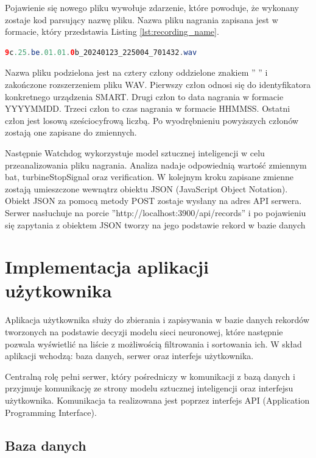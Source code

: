 \documentclass{sprz}
\begin{document}
Pojawienie się nowego pliku wywołuje zdarzenie, które powoduje, że wykonany zostaje kod parsujący nazwę pliku. Nazwa pliku nagrania zapisana jest w formacie, który przedstawia Listing \ref{lst:recording_name}.

\begin{lstlisting}[language=Java,caption={Przykładowa nazwa pliku nagrania}, label={lst:recording_name}]
  9c.25.be.01.01.0b_20240123_225004_701432.wav
\end{lstlisting}

Nazwa pliku podzielona jest na cztery człony oddzielone znakiem ” ” i zakończone rozszerzeniem pliku WAV. Pierwszy człon odnosi się do identyfikatora konkretnego urządzenia SMART. Drugi człon to data nagrania w formacie YYYYMMDD. Trzeci człon to czas nagrania w formacie HHMMSS. Ostatni człon jest losową sześciocyfrową liczbą. Po wyodrębnieniu powyższych członów zostają one zapisane do zmiennych.


Następnie Watchdog wykorzystuje model sztucznej inteligencji w celu przeanalizowania pliku nagrania. Analiza nadaje odpowiednią wartość zmiennym bat, turbineStopSignal oraz verification. W kolejnym kroku zapisane zmienne zostają umieszczone wewnątrz obiektu JSON (JavaScript Object Notation). Obiekt JSON za pomocą metody POST zostaje wysłany na adres API serwera.
Serwer nasłuchuje na porcie ”http://localhost:3900/api/records” i po pojawieniu się zapytania z obiektem JSON tworzy na jego podstawie rekord w bazie danych

\clearpage

\chapter{Implementacja aplikacji użytkownika}

Aplikacja użytkownika służy do zbierania i zapisywania w bazie danych rekordów tworzonych na podstawie decyzji modelu sieci neuronowej, które następnie pozwala wyświetlić na liście z możliwością filtrowania i sortowania ich. W skład aplikacji wchodzą: baza danych, serwer oraz interfejs użytkownika.

Centralną rolę pełni serwer, który pośredniczy w komunikacji z bazą danych i przyjmuje komunikację ze strony modelu sztucznej inteligencji oraz interfejsu użytkownika. Komunikacja ta realizowana jest poprzez interfejs API (Application Programming Interface).
\clearpage

\section{Baza danych}
\end{document}
